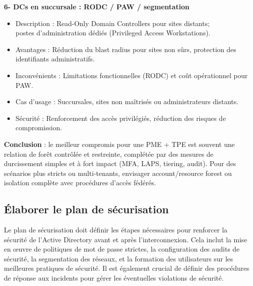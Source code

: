 \noindent \textbf{6- DCs en succursale : RODC / PAW / segmentation}
\begin{itemize}
	\item Description : Read-Only Domain Controllers pour sites distants; \\ postes d'administration dédiés (Privileged Access Workstations).
	\item Avantages : Réduction du blast radius pour sites non sûrs, protection des identifiants administratifs.
	\item Inconvénients : Limitations fonctionnelles (RODC) et coût opérationnel pour PAW.
	\item Cas d'usage : Succursales, sites non maîtrisés ou administrateurs distants.
	\item Sécurité : Renforcement des accès privilégiés, réduction des risques de compromission.
\end{itemize}

\noindent \textbf{Conclusion} : le meilleur compromis pour une PME + TPE est souvent une relation de forêt contrôlée et restreinte, complétée par des mesures de durcissement simples et à fort impact (MFA, LAPS, tiering, audit). Pour des scénarios plus stricts ou multi‑tenants, envisager account/resource forest ou isolation complète avec procédures d'accès fédérés.

\newpage

\subsection*{Élaborer le plan de sécurisation}
{}
\noindent Le plan de sécurisation doit définir les étapes nécessaires pour renforcer la sécurité de l'Active Directory avant et après l'interconnexion. Cela inclut la mise en œuvre de politiques de mot de passe strictes, la configuration des audits de sécurité, la segmentation des réseaux, et la formation des utilisateurs sur les meilleures pratiques de sécurité. Il est également crucial de définir des procédures de réponse aux incidents pour gérer les éventuelles violations de sécurité.

